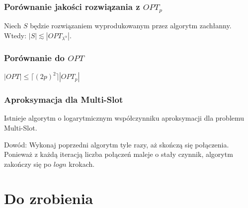 \documentclass[polish, t,10pt]{beamer}
\begin{document}
\begin{frame}
    \frametitle{Porównanie jakości rozwiązania z $OPT_p$}
    \begin{lemma}
        Niech $S$ będzie rozwiązaniem wyprodukowanym przez algorytm zachłanny. Wtedy:
        $|S| \lesssim |OPT_{\lambda^{\alpha}}|$.
    \end{lemma}
\end{frame}

\begin{frame}
    \frametitle{Porównanie do $OPT$}
    \begin{lemma}
        $|OPT| \le \lceil (2p)^2 \rceil |OPT_p|$
    \end{lemma}
\end{frame}

\begin{frame}
    \frametitle{Aproksymacja dla Multi-Slot}
    \begin{lemma}
        Istnieje algorytm o logarytmicznym współczynniku aproksymacji dla problemu
        Multi-Slot.
    \end{lemma}
    Dowód: Wykonaj poprzedni algorytm tyle razy, aż skończą się połączenia. Ponieważ z
    każdą iteracją liczba połączeń maleje o stały czynnik, algorytm zakończy się po
    $log n$ krokach.
\end{frame}

\section{Do zrobienia}
\end{document}
